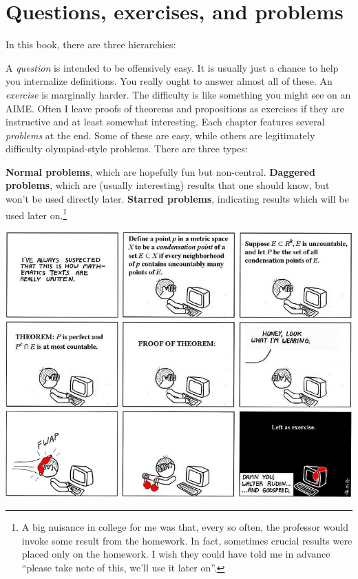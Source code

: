 \section{Questions, exercises, and problems}
In this book, there are three hierarchies:
\begin{itemize}
	\ii A \emph{question} is intended to be offensively easy.
	It is usually just a chance to help you internalize definitions.
	You really ought to answer almost all of these.
	\ii An \emph{exercise} is marginally harder.
	The difficulty is like something you might see on an AIME.
	Often I leave proofs of theorems and propositions as exercises
	if they are instructive and at least somewhat interesting.
	\ii Each chapter features several \emph{problems} at the end.
	Some of these are easy, while others are legitimately difficulty olympiad-style problems.
	There are three types:
	\begin{itemize}
		\ii \textbf{Normal problems}, which are hopefully fun but non-central.
		\ii \textbf{Daggered problems}, which are (usually interesting) results that one should know,
		but won't be used directly later.
		\ii \textbf{Starred problems}, indicating results which will be used later on.\footnote{%
			A big nuisance in college for me was that, every so often, the professor
			would invoke some result from the homework.
			In fact, sometimes crucial results were placed only on the homework.
			I wish they could have told me in advance ``please take note of this, we'll use it later on''.
		}
	\end{itemize}
\end{itemize}

\begin{center}
	\includegraphics[width=14cm]{media/abstruse-goose-exercise.png}
\end{center}

